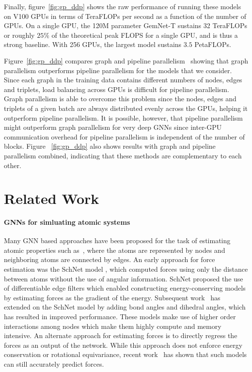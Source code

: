 \documentclass{article} \usepackage{iclr2022_conference,times}
\begin{document}
Finally, figure~\ref{fig:gp_ddp} shows the raw performance of running these models on V100 GPUs in terms of TeraFLOPs per second as a function of the number of GPUs. On a single GPU, the 120M parameter GemNet-T sustains 32 TeraFLOPs or roughly $25\%$ of the theoretical peak FLOPS for a single GPU, and is thus a strong baseline. With 256 GPUs, the largest model sustains $3.5$ PetaFLOPs.

Figure~\ref{fig:gp_ddp} compares graph and pipeline parallelism~\citep{huang2019gpipe} showing that graph parallelism outperforms pipeline parallelism for the models that we consider. Since each graph in the training data contains different numbers of nodes, edges and triplets, load balancing across GPUs is difficult for pipeline parallelism. Graph parallelism is able to overcome this problem since the nodes, edges and triplets of a given batch are always distributed evenly across the GPUs, helping it outperform pipeline parallelism.
It is possible, however, that pipeline parallelism might outperform graph parallelism for very deep GNNs since inter-GPU communication overhead for pipeline parallelism is independent of the number of blocks.
Figure ~\ref{fig:gp_ddp} also shows results with graph and pipeline parallelism combined,
indicating that these methods are complementary to each other.











\section{Related Work}
\label{sec:related}

\paragraph{GNNs for simluating atomic systems}
Many GNN based approaches have been proposed for the task of estimating atomic properties such as~\citep{schutt2017quantum,gilmer2017neural,jorgensen2018neural,schutt2017schnet,schutt2018schnet,xie2018crystal,qiao2020orbnet,klicpera2020directional}, where the atoms are represented by nodes and neighboring atoms are connected by edges. An early approach for force estimation was the SchNet model \cite{schutt2017schnet}, which computed forces using only the distance between atoms without the use of angular information. SchNet proposed the use of differentiable edge filters which enabled constructing energy-conserving models by estimating forces as the gradient of the energy.
Subsequent work~\citep{klicpera_dimenetpp_2020,klicpera2020directional,klicpera2021gemnet,liu2021spherical} has extended on the SchNet model by adding bond angles and dihedral angles, which has resulted in improved performance. These models make use of higher order interactions among nodes which make them highly compute and memory intensive. An alternate approach for estimating forces is to directly regress the forces as an output of the network. While this approach does not enforce energy conservation or rotational equivariance, recent work~\citep{hu2021forcenet} has shown that such models can still accurately predict forces.
\end{document}
